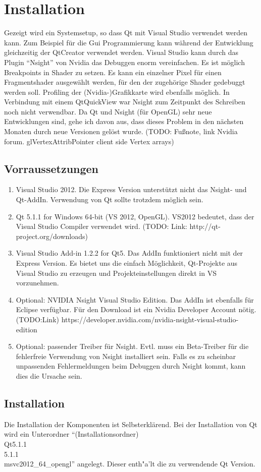 \documentclass[a4paper,12pt]{article}
\begin{document}
\section{Installation}
Gezeigt wird ein Systemsetup, so dass Qt mit Visual Studio verwendet werden kann. Zum Beispiel für die Gui Programmierung kann während der Entwicklung gleichzeitig der QtCreator verwendet werden. Visual Studio kann durch das Plugin "`Nsight"' von Nvidia das Debuggen enorm vereinfachen. Es ist möglich Breakpoints in Shader zu setzen. Es kann ein einzelner Pixel für einen Fragmentshader ausgewählt werden, für den der zugehörige Shader gedebuggt werden soll. Profiling der (Nvidia-)Grafikkarte wird ebenfalls möglich.
In Verbindung mit einem QtQuickView war Nsight zum Zeitpunkt des Schreiben noch nicht verwendbar. Da Qt und Nsight (für OpenGL) sehr neue Entwicklungen sind, gehe ich davon aus, dass dieses Problem in den nächsten Monaten durch neue Versionen gelöst wurde. (TODO: Fußnote, link Nvidia forum. glVertexAttribPointer client side Vertex arrays)
\subsection{Vorraussetzungen}
\begin{enumerate}
\item
Visual Studio 2012. Die Express Version unterstützt nicht das Nsight- und Qt-AddIn. Verwendung von Qt sollte trotzdem möglich sein.
\item
Qt 5.1.1 for Windows 64-bit (VS 2012, OpenGL). VS2012 bedeutet, dass der Visual Studio Compiler verwendet wird. (TODO: Link: http://qt-project.org/downloads)
\item
Visual Studio Add-in 1.2.2 for Qt5. Das AddIn funktioniert nicht mit der Express Version. Es bietet uns die einfach Möglichkeit, Qt-Projekte aus Visual Studio zu erzeugen und Projekteinstellungen direkt in VS vorzunehmen.
\item
Optional: NVIDIA Nsight Visual Studio Edition. Das AddIn ist ebenfalls für Eclipse verfügbar. Für den Download ist ein Nvidia Developer Account nötig. (TODO:Link) https://developer.nvidia.com/nvidia-nsight-visual-studio-edition
\item
Optional: passender Treiber für Nsight. Evtl. muss ein Beta-Treiber für die fehlerfreie Verwendung von Nsight installiert sein. Falls es zu scheinbar unpassenden Fehlermeldungen beim Debuggen durch Nsight kommt, kann dies die Ursache sein.
\end{enumerate}
\subsection{Installation}
Die Installation der Komponenten ist Selbsterklärend.
Bei der Installation von Qt wird ein Unterordner "`(Installationsordner)\\Qt5.1.1\\5.1.1\\msvc2012\_64\_opengl"' angelegt. Dieser enth"a'lt die zu verwendende Qt Version.
\end{document}
